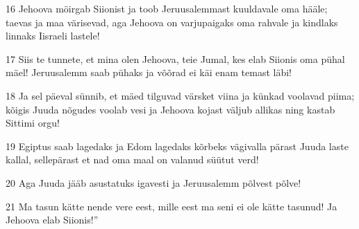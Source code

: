 \par 16 Jehoova möirgab Siionist ja toob Jeruusalemmast kuuldavale oma hääle; taevas ja maa värisevad, aga Jehoova on varjupaigaks oma rahvale ja kindlaks linnaks Iisraeli lastele!
\par 17 Siis te tunnete, et mina olen Jehoova, teie Jumal, kes elab Siionis oma pühal mäel! Jeruusalemm saab pühaks ja võõrad ei käi enam temast läbi!
\par 18 Ja sel päeval sünnib, et mäed tilguvad värsket viina ja künkad voolavad piima; kõigis Juuda nõgudes voolab vesi ja Jehoova kojast väljub allikas ning kastab Sittimi orgu!
\par 19 Egiptus saab lagedaks ja Edom lagedaks kõrbeks vägivalla pärast Juuda laste kallal, sellepärast et nad oma maal on valanud süütut verd!
\par 20 Aga Juuda jääb asustatuks igavesti ja Jeruusalemm põlvest põlve!
\par 21 Ma tasun kätte nende vere eest, mille eest ma seni ei ole kätte tasunud! Ja Jehoova elab Siionis!”

